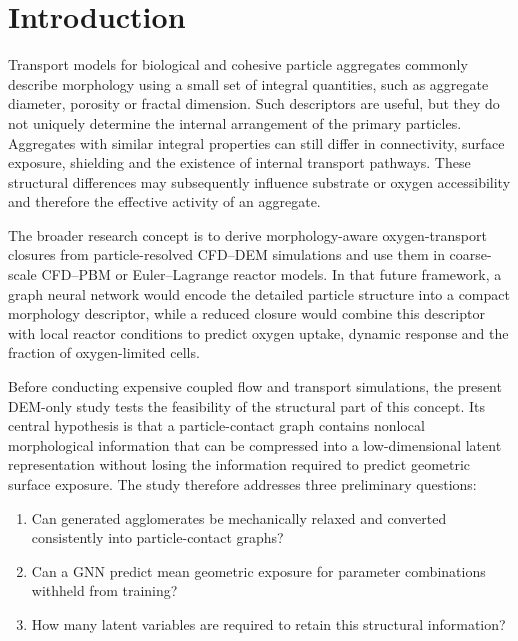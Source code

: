 \documentclass[12pt,a4paper]{article}
\begin{document}

\section{Introduction}
\label{sec:introduction}

Transport models for biological and cohesive particle aggregates commonly
describe morphology using a small set of integral quantities, such as aggregate
diameter, porosity or fractal dimension. Such descriptors are useful, but they
do not uniquely determine the internal arrangement of the primary particles.
Aggregates with similar integral properties can still differ in connectivity,
surface exposure, shielding and the existence of internal transport pathways.
These structural differences may subsequently influence substrate or oxygen
accessibility and therefore the effective activity of an aggregate.

The broader research concept is to derive morphology-aware oxygen-transport
closures from particle-resolved CFD--DEM simulations and use them in
coarse-scale CFD--PBM or Euler--Lagrange reactor models. In that future
framework, a graph neural network would encode the detailed particle structure
into a compact morphology descriptor, while a reduced closure would combine
this descriptor with local reactor conditions to predict oxygen uptake, dynamic
response and the fraction of oxygen-limited cells.

Before conducting expensive coupled flow and transport simulations, the present
DEM-only study tests the feasibility of the structural part of this concept.
Its central hypothesis is that a particle-contact graph contains nonlocal
morphological information that can be compressed into a low-dimensional latent
representation without losing the information required to predict geometric
surface exposure. The study therefore addresses three preliminary questions:
\begin{enumerate}
    \item Can generated agglomerates be mechanically relaxed and converted
    consistently into particle-contact graphs?
    \item Can a GNN predict mean geometric exposure for parameter combinations
    withheld from training?
    \item How many latent variables are required to retain this structural
    information?
\end{enumerate}
\end{document}
